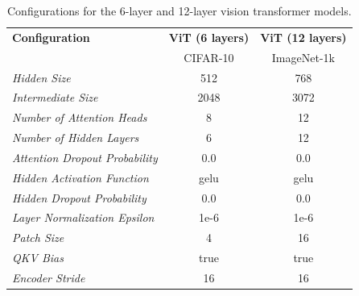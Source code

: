 \begin{table}
%
\centering
\begin{tabular}{l|c|c}
\toprule
\textbf{Configuration}                    & \textbf{ViT (6 layers)} & \textbf{ViT (12 layers)} \\
                                          & CIFAR-10                & ImageNet-1k              \\
\midrule
%
\textit{Hidden Size}                      & 512             & 768                  \\
\textit{Intermediate Size}                & 2048            & 3072                 \\
\textit{Number of Attention Heads}        & 8               & 12                   \\
\textit{Number of Hidden Layers}          & 6               & 12                   \\
\textit{Attention Dropout Probability}    & 0.0             & 0.0                  \\
\textit{Hidden Activation Function}       & gelu            & gelu                 \\
\textit{Hidden Dropout Probability}       & 0.0             & 0.0                  \\
\textit{Layer Normalization Epsilon}      & 1e-6            & 1e-6                 \\
\textit{Patch Size}                       & 4               & 16                   \\
\textit{QKV Bias}                         & true            & true                 \\
\textit{Encoder Stride}                   & 16              & 16                   \\
%
\bottomrule
\end{tabular}
\caption{Configurations for the 6-layer and 12-layer vision transformer models.}
%
\label{tab:vit_configs}
\end{table}